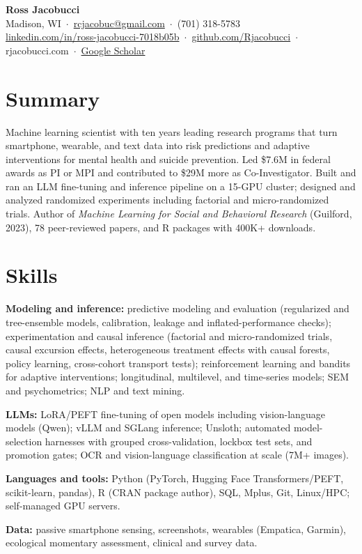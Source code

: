 \documentclass[10pt,letterpaper]{article}
\begin{document}
{\LARGE\bfseries Ross Jacobucci}\\[3pt]
Madison, WI \,$\cdot$\, \href{mailto:rcjacobuc@gmail.com}{rcjacobuc@gmail.com} \,$\cdot$\, (701) 318-5783\\[1pt]
\href{https://www.linkedin.com/in/ross-jacobucci-7018b05b/}{linkedin.com/in/ross-jacobucci-7018b05b} \,$\cdot$\, \href{https://github.com/Rjacobucci}{github.com/Rjacobucci} \,$\cdot$\, rjacobucci.com \,$\cdot$\, \href{https://scholar.google.com/citations?user=K7_cclwAAAAJ}{Google Scholar}
\vspace{4pt}

\section{Summary}
Machine learning scientist with ten years leading research programs that turn smartphone, wearable, and text data into risk predictions and adaptive interventions for mental health and suicide prevention. Led \$7.6M in federal awards as PI or MPI and contributed to \$29M more as Co-Investigator. Built and ran an LLM fine-tuning and inference pipeline on a 15-GPU cluster; designed and analyzed randomized experiments including factorial and micro-randomized trials. Author of \textit{Machine Learning for Social and Behavioral Research} (Guilford, 2023), 78 peer-reviewed papers, and R packages with 400K+ downloads.

\section{Skills}
\textbf{Modeling and inference:} predictive modeling and evaluation (regularized and tree-ensemble models, calibration, leakage and inflated-performance checks); experimentation and causal inference (factorial and micro-randomized trials, causal excursion effects, heterogeneous treatment effects with causal forests, policy learning, cross-cohort transport tests); reinforcement learning and bandits for adaptive interventions; longitudinal, multilevel, and time-series models; SEM and psychometrics; NLP and text mining.\par\vspace{2pt}
\textbf{LLMs:} LoRA/PEFT fine-tuning of open models including vision-language models (Qwen); vLLM and SGLang inference; Unsloth; automated model-selection harnesses with grouped cross-validation, lockbox test sets, and promotion gates; OCR and vision-language classification at scale (7M+ images).\par\vspace{2pt}
\textbf{Languages and tools:} Python (PyTorch, Hugging Face Transformers/PEFT, scikit-learn, pandas), R (CRAN package author), SQL, Mplus, Git, Linux/HPC; self-managed GPU servers.\par\vspace{2pt}
\textbf{Data:} passive smartphone sensing, screenshots, wearables (Empatica, Garmin), ecological momentary assessment, clinical and survey data.
\end{document}
